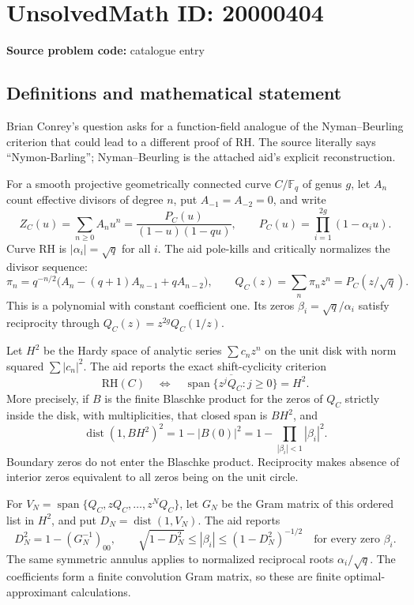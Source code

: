 \documentclass[11pt]{article}
\newcommand{\F}{\mathbb{F}}
\begin{document}
\section*{UnsolvedMath ID: 20000404}
\textbf{Source problem code:} catalogue entry
\subsection{Definitions and mathematical statement}
Brian Conrey's question asks for a function-field analogue of the Nyman--Beurling criterion that could lead to a different proof of RH. The source literally says ``Nymon-Barling''; Nyman--Beurling is the attached aid's explicit reconstruction.

For a smooth projective geometrically connected curve \(C/\F_q\) of genus \(g\), let \(A_n\) count effective divisors of degree \(n\), put \(A_{-1}=A_{-2}=0\), and write
\[
Z_C(u)=\sum_{n\geq0}A_nu^n=\frac{P_C(u)}{(1-u)(1-qu)},
\qquad P_C(u)=\prod_{i=1}^{2g}(1-\alpha_i u).
\]
Curve RH is \(|\alpha_i|=\sqrt q\) for all \(i\). The aid pole-kills and critically normalizes the divisor sequence:
\[
\pi_n=q^{-n/2}\bigl(A_n-(q+1)A_{n-1}+qA_{n-2}\bigr),
\qquad Q_C(z)=\sum_n\pi_nz^n=P_C(z/\sqrt q).
\]
This is a polynomial with constant coefficient one. Its zeros \(\beta_i=\sqrt q/\alpha_i\) satisfy reciprocity through \(Q_C(z)=z^{2g}Q_C(1/z)\).

Let \(H^2\) be the Hardy space of analytic series \(\sum c_nz^n\) on the unit disk with norm squared \(\sum|c_n|^2\). The aid reports the exact shift-cyclicity criterion
\[
\mathrm{RH}(C)\quad\Longleftrightarrow\quad
\overline{\operatorname{span}\{z^jQ_C:j\geq0\}}=H^2.
\]
More precisely, if \(B\) is the finite Blaschke product for the zeros of \(Q_C\) strictly inside the disk, with multiplicities, that closed span is \(BH^2\), and
\[
\operatorname{dist}(1,BH^2)^2
=1-|B(0)|^2
=1-\prod_{|\beta_i|<1}|\beta_i|^2.
\]
Boundary zeros do not enter the Blaschke product. Reciprocity makes absence of interior zeros equivalent to all zeros being on the unit circle.

For \(V_N=\operatorname{span}\{Q_C,zQ_C,\ldots,z^NQ_C\}\), let \(G_N\) be the Gram matrix of this ordered list in \(H^2\), and put \(D_N=\operatorname{dist}(1,V_N)\). The aid reports
\[
D_N^2=1-(G_N^{-1})_{00},
\qquad
\sqrt{1-D_N^2}\leq|\beta_i|\leq(1-D_N^2)^{-1/2}
\quad\text{for every zero }\beta_i.
\]
The same symmetric annulus applies to normalized reciprocal roots \(\alpha_i/\sqrt q\). The coefficients form a finite convolution Gram matrix, so these are finite optimal-approximant calculations.
\end{document}
